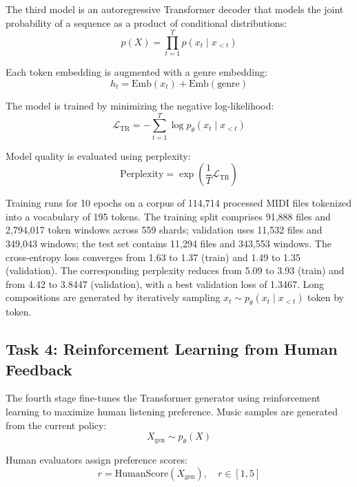 \documentclass[conference]{IEEEtran}
\begin{document}
The third model is an autoregressive Transformer decoder that models the
joint probability of a sequence as a product of conditional distributions:
\begin{equation}
p(X) = \prod_{t=1}^{T} p(x_t \mid x_{<t})
\end{equation}

Each token embedding is augmented with a genre embedding:
\begin{equation}
h_t = \text{Emb}(x_t) + \text{Emb}(\text{genre})
\end{equation}

The model is trained by minimizing the negative log-likelihood:
\begin{equation}
\mathcal{L}_{\text{TR}} = -\sum_{t=1}^{T} \log p_\theta(x_t \mid x_{<t})
\end{equation}

Model quality is evaluated using perplexity:
\begin{equation}
\text{Perplexity} = \exp\!\left(\frac{1}{T} \mathcal{L}_{\text{TR}}\right)
\end{equation}

Training runs for 10 epochs on a corpus of 114,714 processed MIDI files
tokenized into a vocabulary of 195 tokens. The training split comprises 91,888
files and 2,794,017 token windows across 559 shards; validation uses 11,532
files and 349,043 windows; the test set contains 11,294 files and 343,553
windows. The cross-entropy loss converges from 1.63 to 1.37 (train) and 1.49
to 1.35 (validation). The corresponding perplexity reduces from 5.09 to 3.93
(train) and from 4.42 to 3.8447 (validation), with a best validation loss of
1.3467. Long compositions are generated by iteratively sampling $x_t \sim
p_\theta(x_t \mid x_{<t})$ token by token.

\subsection{Task 4: Reinforcement Learning from Human Feedback}

The fourth stage fine-tunes the Transformer generator using reinforcement
learning to maximize human listening preference. Music samples are generated
from the current policy:
\begin{equation}
X_{\text{gen}} \sim p_\theta(X)
\end{equation}

Human evaluators assign preference scores:
\begin{equation}
r = \text{HumanScore}(X_{\text{gen}}), \quad r \in [1, 5]
\end{equation}
\end{document}
